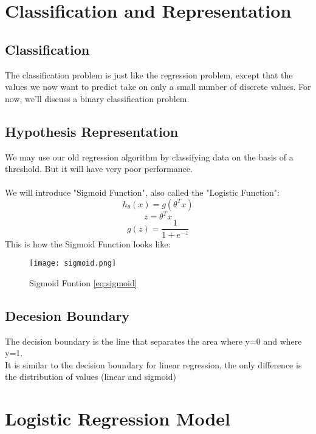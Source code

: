 \section{Classification and Representation}

  \subsection{Classification}
    The classification problem is just like the regression problem, except that the values we now want to predict take on only a small number of discrete values. For now, we'll discuss a binary classification problem.

  \subsection{Hypothesis Representation}
    We may use our old regression algorithm by classifying data on the basis of a threshold. But it will have very poor performance.\\ 
    \\We will introduce "Sigmoid Function", also called the "Logistic Function":
    \begin{equation}
      h_\theta(x) = g(\theta^{T}x)
    \end{equation}
    \begin{equation}
      z = \theta^{T}x
    \end{equation}
    \begin{equation}\label{eq:sigmoid}
      g(z) = \frac{1}{1+e^{-z}}
    \end{equation}
    This is how the Sigmoid Function looks like:
    \begin{figure}[h]
      \centering
      \texttt{[image: sigmoid.png]}
      \caption{Sigmoid Funtion \ref{eq:sigmoid}}
    \end{figure}

  \subsection{Decesion Boundary}
    The decision boundary is the line that separates the area where y=0 and where y=1.\\
    It is similar to the decision boundary for linear regression, the only difference is the distribution of values (linear and sigmoid)

\section{Logistic Regression Model}

